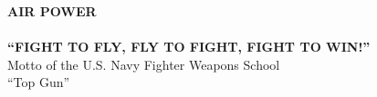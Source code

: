 \thispagestyle{empty}

\begin{minipage}{\linewidth}
\vspace{3ex}
\begin{center}
{\LARGE \textbf{AIR POWER}}\\
\vspace{3ex}
\thisversion\\
\vspace{3ex}
\textbf{“FIGHT TO FLY, FLY TO FIGHT, FIGHT TO WIN!”}\\
\vspace{1ex}
Motto of the U.S. Navy Fighter Weapons School\\
\vspace{1ex}
“Top Gun”
\end{center}
\vspace{2ex}
\end{minipage}

